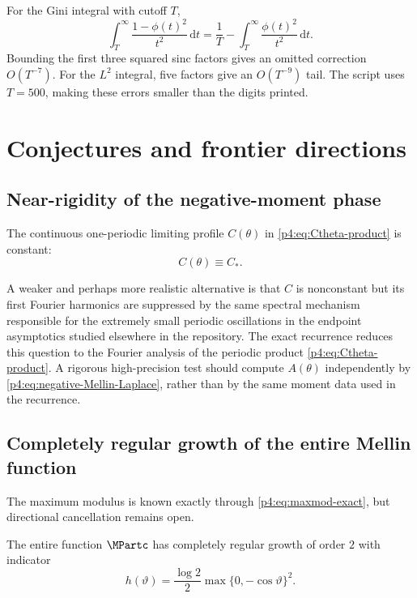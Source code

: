\documentclass[11pt,oneside]{article}
\theoremstyle{definition}
\theoremstyle{remark}
\newcommand{\dd}{\,\mathrm d}
\newcommand{\1}{\mathbf 1}
\begin{document}
For the Gini integral with cutoff \(T\),
\[
 \int_T^\infty\frac{1-\phi(t)^2}{t^2}\dd t
 =\frac1T-\int_T^\infty\frac{\phi(t)^2}{t^2}\dd t.
\]
Bounding the first three squared sinc factors gives an omitted correction
\(O(T^{-7})\).  For the \(L^2\) integral, five factors give an \(O(T^{-9})\) tail.
The script uses \(T=500\), making these errors smaller than the digits printed.

\section{Conjectures and frontier directions}

\subsection{Near-rigidity of the negative-moment phase}

\begin{conjecture}\label{p4:conj:phase-constant}
The continuous one-periodic limiting profile \(C(\theta)\) in
\cref{p4:eq:Ctheta-product} is constant:
\begin{equation}\label{p4:eq:Ctheta-conjecture}
 C(\theta)\equiv C_*.
\end{equation}
\end{conjecture}

A weaker and perhaps more realistic alternative is that \(C\) is nonconstant but its
first Fourier harmonics are suppressed by the same spectral mechanism responsible for
the extremely small periodic oscillations in the endpoint asymptotics studied elsewhere
in the repository.  The exact recurrence reduces this question to the Fourier analysis
of the periodic product \cref{p4:eq:Ctheta-product}.  A rigorous high-precision
test should compute \(A(\theta)\) independently by \cref{p4:eq:negative-Mellin-Laplace},
rather than by the same moment data used in the recurrence.

\subsection{Completely regular growth of the entire Mellin function}

The maximum modulus is known exactly through \cref{p4:eq:maxmod-exact}, but directional
cancellation remains open.

\begin{conjecture}\label{p4:conj:indicator}
The entire function \(\MPartc\) has completely regular growth of order \(2\) with indicator
\begin{equation}\label{p4:eq:indicator-conjecture}
 h(\vartheta)=\frac{\log2}{2}
 \max\{0,-\cos\vartheta\}^2.
\end{equation}
\end{conjecture}
\end{document}
